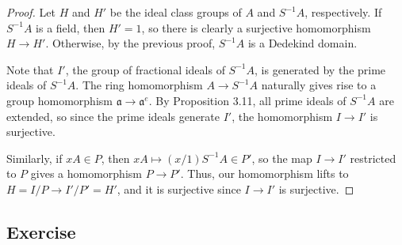 \begin{proof}
Let $H$ and $H'$ be the ideal class groups of $A$ and $S^{-1}A$, respectively. If $S^{-1}A$ is a field, then $H' = 1$, so there is clearly a surjective
homomorphism $H \to H'$. Otherwise, by the previous proof, $S^{-1}A$ is a Dedekind domain. 

Note that $I'$, the group of fractional ideals of $S^{-1}A$, is generated by the prime ideals of $S^{-1}A$. The ring homomorphism $A \to S^{-1}A$ naturally 
gives rise to a group homomorphism $\mathfrak{a} \to \mathfrak{a}^e$. By Proposition 3.11, all prime ideals of $S^{-1}A$ are extended, so since the prime
ideals generate $I'$, the homomorphism $I \to I'$ is surjective.

Similarly, if $xA \in P$, then $xA \mapsto (x/1)S^{-1}A \in P'$, so the map $I \to I'$ restricted to $P$ gives a homomorphism $P \to P'$. Thus, our homomorphism
lifts to $H = I/P \to I'/P' = H'$, and it is surjective since $I \to I'$ is surjective.
\end{proof}

\subsection{Exercise}\label{9.2}

